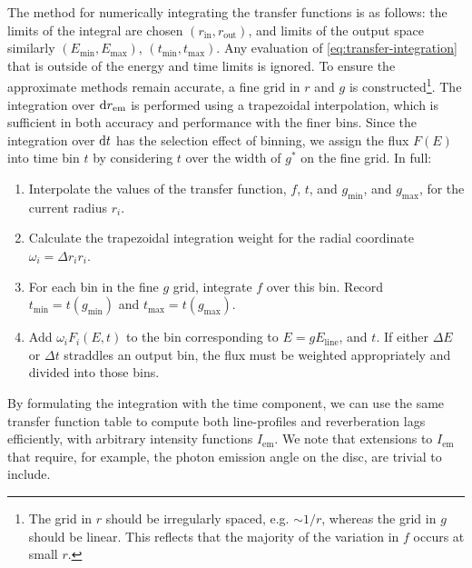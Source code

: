 The method for numerically integrating the transfer functions is as follows: the limits of the integral are chosen $(r_\text{in}, r_\text{out})$, and limits of the output space similarly $(E_\text{min}, E_\text{max})$, $(t_\text{min}, t_\text{max})$. Any evaluation of \eqref{eq:transfer-integration} that is outside of the energy and time limits is ignored. To ensure the approximate methods remain accurate, a fine grid in $r$ and $g$ is constructed\footnote{The grid in $r$ should be irregularly spaced, e.g. $\sim 1 / r$, whereas the grid in $g$ should be linear. This reflects that the majority of the variation in $f$ occurs at small $r$.}. The integration over $\text{d} r_\text{em}$ is performed using a trapezoidal interpolation, which is sufficient in both accuracy and performance with the finer bins. Since the integration over $\text{d} t$ has the selection effect of binning, we assign the flux $F(E)$ into time bin $t$ by considering $t$ over the width of $g^\ast$ on the fine grid. In full:
\begin{enumerate}
    \item Interpolate the values of the transfer function, $f$, $t$, and $g_\text{min}$, and $g_\text{max}$, for the current radius $r_i$.
    \item Calculate the trapezoidal integration weight for the radial coordinate $\omega_i = \Delta r_i r_i$.
    \item For each bin in the fine $g$ grid, integrate $f$ over this bin. Record $t_\text{min} = t(g_\text{min})$ and $t_\text{max} = t(g_\text{max})$.
    \item Add $\omega_i F_i(E, t)$ to the bin corresponding to $E = gE_\text{line}$, and $t$. If either $\Delta E$ or $\Delta t$ straddles an output bin, the flux must be weighted appropriately and divided into those bins. 
\end{enumerate}

By formulating the integration with the time component, we can use the same transfer function table to compute both line-profiles and reverberation lags efficiently, with arbitrary intensity functions $I_\text{em}$. We note that extensions to $I_\text{em}$ that require, for example, the photon emission angle on the disc, are trivial to include.

